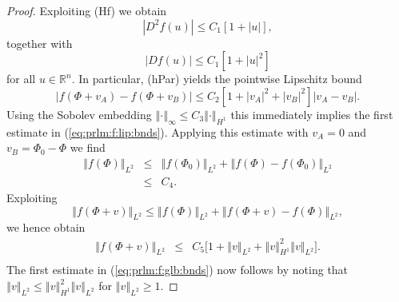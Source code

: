\documentclass[10pt]{articleHJ}
\newcommand{\Real}{\mathbb{R}}							%
\newcommand{\abs}[1]{\left\vert#1\right\vert}			%
\newcommand{\norm}[1]{\left\Vert#1\right\Vert}		%
\newcommand{\sref}[1]{(\ref{#1})}                       %
\numberwithin{equation}{section}
\begin{document}
\begin{proof}
Exploiting (Hf) we obtain
\begin{equation}
\label{eq:prlm:f:bnd:d2:f}
\abs{D^2 f(u)} \le C_1[ 1 + \abs{u} ],
\end{equation}
together with
\begin{equation}
\abs{Df(u)} \le C_1 [ 1 + \abs{u}^2 ]
\end{equation}
for all $u \in \Real^n$.
In particular, (hPar) yields
the pointwise Lipschitz bound
\begin{equation}
\label{eq:prlm:f:pointwise:lip}
\abs{f(\Phi + v_A) - f(\Phi + v_B) }
\le C_2[ 1 +
    \abs{v_A}^2 +  \abs{v_B}^2
   ] \abs{v_A - v_B}.
\end{equation}
Using the Sobolev embedding
$\norm{\cdot}_{\infty} \le C_3 \norm{\cdot}_{H^1}$
this immediately implies the first
estimate in \sref{eq:prlm:f:lip:bnds}.
Applying this estimate with $v_A = 0$
and $v_B = \Phi_0 - \Phi$
we find
\begin{equation}
\label{eq:prlm:f:apriori:f:phi}
\begin{array}{lcl}
\norm{f(\Phi)}_{L^2}
 & \le & \norm{f( \Phi_0)}_{L^2} + \norm{f(\Phi) - f(\Phi_0)}_{L^2}
\\[0.2cm]
 & \le & C_4.
\end{array}
\end{equation}
Exploiting
\begin{equation}
\norm{f(\Phi + v)}_{L^2}
\le \norm{f(\Phi)}_{L^2}
  + \norm{f(\Phi +v) - f(\Phi)}_{L^2},
\end{equation}
we hence
obtain
\begin{equation}
\begin{array}{lcl}
 \norm{f(\Phi + v)}_{L^2} & \le &
   C_5 \big[1 + \norm{v}_{L^2} + \norm{v}_{H^1}^2 \norm{v}_{L^2} \big] .
\\[0.2cm]
\end{array}
\end{equation}
The first estimate
in \sref{eq:prlm:f:glb:bnds}
now follows by noting
that
$\norm{v}_{L^2}
\le \norm{v}_{H^1}^2 \norm{v}_{L^2}$
for $\norm{v}_{L^2} \ge 1$.


\end{proof}
\end{document}
